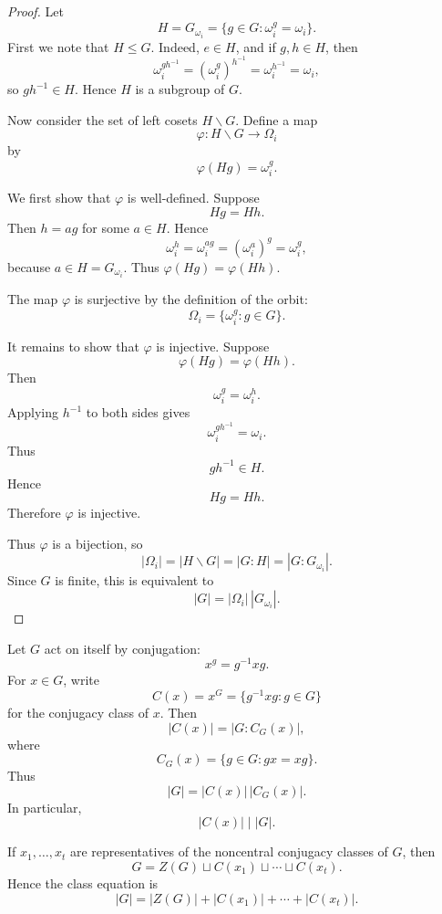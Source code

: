 \begin{proof}
    Let
    \[
        H=G_{\omega_i}
        =
        \{g\in G:\omega_i^g=\omega_i\}.
    \]
    First we note that \(H\leq G\). Indeed, \(e\in H\), and if \(g,h\in H\), then
    \[
        \omega_i^{gh^{-1}}
        =
        (\omega_i^g)^{h^{-1}}
        =
        \omega_i^{h^{-1}}
        =
        \omega_i,
    \]
    so \(gh^{-1}\in H\). Hence \(H\) is a subgroup of \(G\).
    
    Now consider the set of left cosets \(H\backslash G\). Define a map
    \[
        \varphi:H\backslash G\longrightarrow \Omega_i
    \]
    by
    \[
        \varphi(Hg)=\omega_i^g.
    \]
    
    We first show that \(\varphi\) is well-defined. Suppose
    \[
        Hg=Hh.
    \]
    Then \(h=ag\) for some \(a\in H\). Hence
    \[
        \omega_i^h
        =
        \omega_i^{ag}
        =
        (\omega_i^a)^g
        =
        \omega_i^g,
    \]
    because \(a\in H=G_{\omega_i}\). Thus \(\varphi(Hg)=\varphi(Hh)\).
    
    The map \(\varphi\) is surjective by the definition of the orbit:
    \[
        \Omega_i
        =
        \{\omega_i^g:g\in G\}.
    \]
    
    It remains to show that \(\varphi\) is injective. Suppose
    \[
        \varphi(Hg)=\varphi(Hh).
    \]
    Then
    \[
        \omega_i^g=\omega_i^h.
    \]
    Applying \(h^{-1}\) to both sides gives
    \[
        \omega_i^{gh^{-1}}=\omega_i.
    \]
    Thus
    \[
        gh^{-1}\in H.
    \]
    Hence
    \[
        Hg=Hh.
    \]
    Therefore \(\varphi\) is injective.
    
    Thus \(\varphi\) is a bijection, so
    \[
        |\Omega_i|
        =
        |H\backslash G|
        =
        |G:H|
        =
        |G:G_{\omega_i}|.
    \]
    Since \(G\) is finite, this is equivalent to
    \[
        |G|
        =
        |\Omega_i|\,|G_{\omega_i}|.
    \]
    \end{proof}

\begin{example}
Let $G$ act on itself by conjugation:
\[
    x^g=g^{-1}xg.
\]
For $x\in G$, write
\[
    C(x)=x^G=\{g^{-1}xg:g\in G\}
\]
for the conjugacy class of $x$. Then
\[
    |C(x)|=|G:C_G(x)|,
\]
where
\[
    C_G(x)=\{g\in G:gx=xg\}.
\]
Thus
\[
    |G|=|C(x)|\,|C_G(x)|.
\]
In particular,
\[
    |C(x)|\mid |G|.
\]

If $x_1,\ldots,x_t$ are representatives of the noncentral conjugacy classes of $G$, then
\[
    G
    =
    Z(G)\sqcup C(x_1)\sqcup\cdots\sqcup C(x_t).
\]
Hence the class equation is
\[
    |G|
    =
    |Z(G)|+|C(x_1)|+\cdots+|C(x_t)|.
\]
\end{example}

